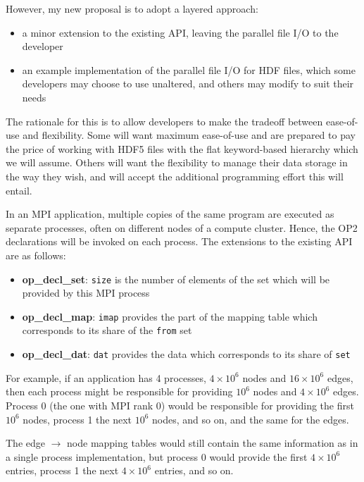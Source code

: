 \documentclass[11pt]{article}
\begin{document}
However, my new proposal is to adopt a layered approach:
\begin{itemize}
\item
a minor extension to the existing API, leaving the parallel file I/O to the 
developer

\item
an example implementation of the parallel file I/O for HDF files, which some
developers may choose to use unaltered, and others may modify to suit their needs
\end{itemize}

The rationale for this is to allow developers to make the tradeoff between 
ease-of-use and flexibility.  Some will want maximum ease-of-use and are prepared 
to pay the price of working with HDF5 files with the flat keyword-based hierarchy
which we will assume.  Others will want the flexibility 
to manage their data storage in the way they wish, and will accept the additional
programming effort this will entail.

In an MPI application, multiple copies of the same program are executed as
separate processes, often on different nodes of a compute cluster.  Hence, the 
OP2 declarations will be invoked on each process.  The extensions to the existing 
API are as follows:
\begin{itemize}
\item {\bf op\_decl\_set}: {\tt size} is the number of elements of the set which
will be provided by this MPI process

\item {\bf op\_decl\_map}: {\tt imap} provides the part of the mapping table 
which corresponds to its share of the {\tt from} set

\item {\bf op\_decl\_dat}: {\tt dat} provides the data which corresponds to its 
share of {\tt set}
\end{itemize}

For example, if an application has 4 processes, $4\!\times\! 10^6$ nodes and 
$16 \!\times\! 10^6$ edges, then each process might be responsible for providing
$10^6$ nodes and $4\!\times\! 10^6$ edges. Process 0 (the one with MPI rank 0)
would be responsible for providing the first $10^6$ nodes, process 1 the 
next $10^6$ nodes, and so on, and the same for the edges.

The edge $\rightarrow$ node mapping tables would still contain the same 
information as in a single process implementation, but process 0 would provide
the first $4\!\times\! 10^6$ entries, process 1 the next $4\!\times\! 10^6$ entries, 
and so on.
\end{document}
